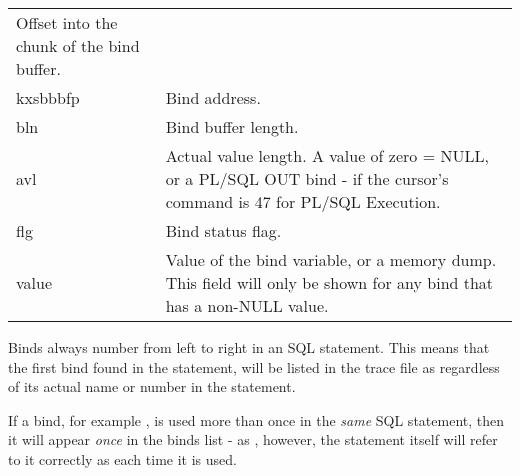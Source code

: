 \begin{longtable}[]{@{}l|l@{}}
\begin{minipage}[t]{0.65\columnwidth}
Offset into the chunk of the bind buffer.\strut
\end{minipage}\tabularnewline
\begin{minipage}[t]{0.14\columnwidth}\raggedright\strut
kxsbbbfp\strut
\end{minipage} & \begin{minipage}[t]{0.65\columnwidth}\raggedright\strut
Bind address.\strut
\end{minipage}\tabularnewline
\begin{minipage}[t]{0.14\columnwidth}\raggedright\strut
bln\strut
\end{minipage} & \begin{minipage}[t]{0.65\columnwidth}\raggedright\strut
Bind buffer length.\strut
\end{minipage}\tabularnewline
\begin{minipage}[t]{0.14\columnwidth}\raggedright\strut
avl\strut
\end{minipage} & \begin{minipage}[t]{0.65\columnwidth}\raggedright\strut
Actual value length. A value of zero = NULL, or a PL/SQL OUT bind - if
the cursor's command is 47 for PL/SQL Execution.\strut
\end{minipage}\tabularnewline
\begin{minipage}[t]{0.14\columnwidth}\raggedright\strut
flg\strut
\end{minipage} & \begin{minipage}[t]{0.65\columnwidth}\raggedright\strut
Bind status flag.\strut
\end{minipage}\tabularnewline
\begin{minipage}[t]{0.14\columnwidth}\raggedright\strut
value\strut
\end{minipage} & \begin{minipage}[t]{0.65\columnwidth}\raggedright\strut
Value of the bind variable, or a memory dump. This field will only be
shown for any bind that has a non-NULL value.\strut
\end{minipage}\tabularnewline
\bottomrule
\end{longtable}

Binds always number from left to right in an SQL statement. This means that the first bind found in the statement, will be listed in the trace file as  regardless of its actual name or number in the statement.

If a bind, for example , is used more than once in the \emph{same} SQL statement, then it will appear \emph{once} in the binds list - as , however, the statement itself will refer to it correctly as  each time it is used.

